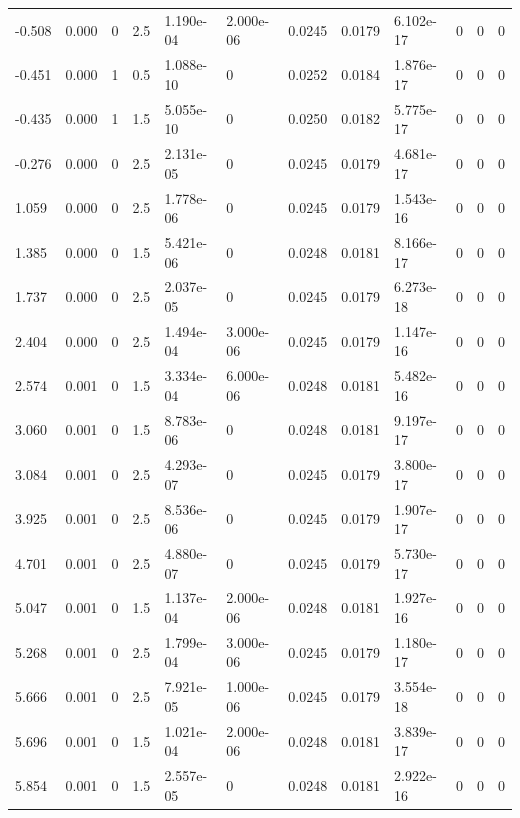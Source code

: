 \documentclass[preview]{standalone}
\begin{document}
{{\begin{tabular}{L{1.2cm}C{1.2cm} C{0.3cm}C{0.5cm} C{1.4cm}C{1.4cm} C{1.4cm}C{1.4cm} C{1.6cm}C{1.6cm} C{1.6cm}C{1.6cm}}
  -0.508  &  0.000  & 0     & 2.5 &  1.190e-04  & 2.000e-06  &  0.0245&   0.0179& 6.102e-17 & 0   &  0 & 0  \\ 
  -0.451  &  0.000  & 1     & 0.5 &  1.088e-10  & 0  &  0.0252&   0.0184& 1.876e-17 & 0   &  0 & 0  \\ 
  -0.435  &  0.000  & 1     & 1.5 &  5.055e-10  & 0  &  0.0250&   0.0182& 5.775e-17 & 0   &  0 & 0  \\ 
  -0.276  &  0.000  & 0     & 2.5 &  2.131e-05  & 0  &  0.0245&   0.0179& 4.681e-17 & 0   &  0 & 0  \\ 
  1.059  &  0.000  & 0     & 2.5 &  1.778e-06  & 0  &  0.0245&   0.0179& 1.543e-16 & 0   &  0 & 0  \\ 
  1.385  &  0.000  & 0     & 1.5 &  5.421e-06  & 0  &  0.0248&   0.0181& 8.166e-17 & 0   &  0 & 0  \\ 
  1.737  &  0.000  & 0     & 2.5 &  2.037e-05  & 0  &  0.0245&   0.0179& 6.273e-18 & 0   &  0 & 0  \\ 
  2.404  &  0.000  & 0     & 2.5 &  1.494e-04  & 3.000e-06  &  0.0245&   0.0179& 1.147e-16 & 0   &  0 & 0  \\ 
  2.574  &  0.001  & 0     & 1.5 &  3.334e-04  & 6.000e-06  &  0.0248&   0.0181& 5.482e-16 & 0   &  0 & 0  \\ 
  3.060  &  0.001  & 0     & 1.5 &  8.783e-06  & 0  &  0.0248&   0.0181& 9.197e-17 & 0   &  0 & 0  \\ 
  3.084  &  0.001  & 0     & 2.5 &  4.293e-07  & 0  &  0.0245&   0.0179& 3.800e-17 & 0   &  0 & 0  \\ 
  3.925  &  0.001  & 0     & 2.5 &  8.536e-06  & 0  &  0.0245&   0.0179& 1.907e-17 & 0   &  0 & 0  \\ 
  4.701  &  0.001  & 0     & 2.5 &  4.880e-07  & 0  &  0.0245&   0.0179& 5.730e-17 & 0   &  0 & 0  \\ 
  5.047  &  0.001  & 0     & 1.5 &  1.137e-04  & 2.000e-06  &  0.0248&   0.0181& 1.927e-16 & 0   &  0 & 0  \\ 
  5.268  &  0.001  & 0     & 2.5 &  1.799e-04  & 3.000e-06  &  0.0245&   0.0179& 1.180e-17 & 0   &  0 & 0  \\ 
  5.666  &  0.001  & 0     & 2.5 &  7.921e-05  & 1.000e-06  &  0.0245&   0.0179& 3.554e-18 & 0   &  0 & 0  \\ 
  5.696  &  0.001  & 0     & 1.5 &  1.021e-04  & 2.000e-06  &  0.0248&   0.0181& 3.839e-17 & 0   &  0 & 0  \\ 
  5.854  &  0.001  & 0     & 1.5 &  2.557e-05  & 0  &  0.0248&   0.0181& 2.922e-16 & 0   &  0 & 0  \\ 

\end{tabular}}}
\end{document}

